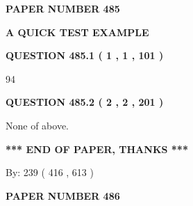 \documentclass[12pt]{article}
\begin{document}
   
   
   
\newpage 
\setcounter{page}{ 
   485001 } 
   
   
   
   
 {\textbf{ \Large{ PAPER NUMBER  485  }}}
   
   
\vspace{0.2in}
   
   
   
   
   
   
 \vspace{0.2in}
{\LARGE {\textbf{ A QUICK TEST EXAMPLE}}}
   
   
  
\vspace{0.2in}
  
{\textbf{\Large{QUESTION
485.1 
 ( 1 , 1 , 101 )
}}}
  
  
 
 
\noindent{}

94
 
 
  
\vspace{0.2in}
  
{\textbf{\Large{QUESTION
485.2 
 ( 2 , 2 , 201 )
}}}
  
  
 
 
\noindent{}
 
 
 None of above.
 
 
 
 
   
   
 \vspace{0.2in}
 
   
   
   
   
\vspace{1.0in} 
{\textbf{\large{ *** END OF PAPER, THANKS *** }}} 
   
   
\hspace{1.0in} By: 
 239 ( 416 ,  613 )
   
   
   
   
\newpage 
\setcounter{page}{ 
   486001 } 
   
   
   
   
 {\textbf{ \Large{ PAPER NUMBER  486  }}}
   
\end{document}
